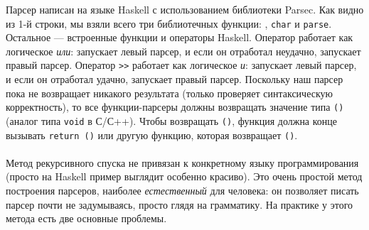 \documentclass[11pt]{book}
\begin{document}

Парсер написан на языке Haskell с использованием библиотеки Parsec.
Как видно из 1-й строки, мы взяли всего три библиотечных функции: \texttt{\footnotesize <|>}, \texttt{\footnotesize char} и \texttt{\footnotesize parse}.
Остальное --- встроенные функции и операторы Haskell.
Оператор \texttt{\footnotesize <|>} работает как логическое \emph{или}: запускает левый парсер,
и если он отработал неудачно, запускает правый парсер.
Оператор \texttt{\footnotesize >\thinspace >} работает как логическое \emph{и}: запускает левый парсер,
и если он отработал удачно, запускает правый парсер.
Поскольку наш парсер пока не возвращает никакого результата (только проверяет синтаксическую корректность),
то все функции-парсеры должны возвращать значение типа \texttt{\footnotesize ()} 
(аналог типа \texttt{\footnotesize void} в С/С++). Чтобы возвращать \texttt{\footnotesize ()},
функция должна конце вызывать \texttt{\footnotesize return ()} или другую функцию, которая возвращает \texttt{\footnotesize ()}.
\\ \\
Метод рекурсивного спуска не привязан к конкретному языку программирования
(просто на Haskell пример выглядит особенно красиво). Это очень простой метод
построения парсеров, наиболее \emph{естественный} для человека: он позволяет писать парсер почти не задумываясь,
просто глядя на грамматику. На практике у этого метода есть две основные проблемы.
\end{document}
